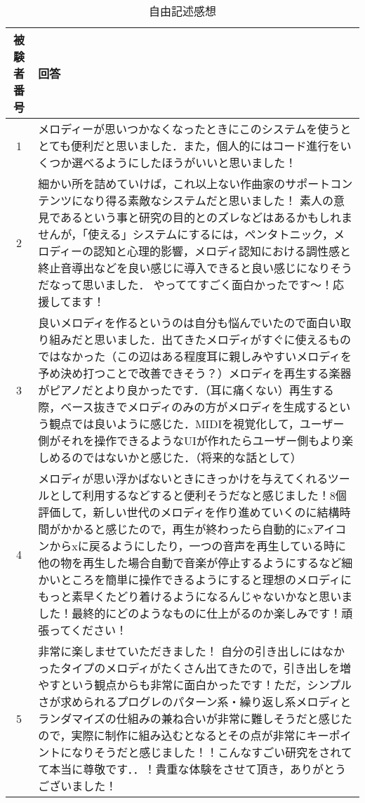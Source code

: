 \begin{table}[htbp]
  \begin{center}
    \caption{自由記述感想}
    \begin{tabular}{cp{30em}}
      \hline
      被験者番号 & 回答\rule[-3mm]{0mm}{8mm} \\ \hline \hline
      1 & メロディーが思いつかなくなったときにこのシステムを使うととても便利だと思いました．また，個人的にはコード進行をいくつか選べるようにしたほうがいいと思いました！ \\ \hline
      2 & 細かい所を詰めていけば，これ以上ない作曲家のサポートコンテンツになり得る素敵なシステムだと思いました！
      素人の意見であるという事と研究の目的とのズレなどはあるかもしれませんが，「使える」システムにするには，ペンタトニック，メロディーの認知と心理的影響，メロディ認知における調性感と終止音導出などを良い感じに導入できると良い感じになりそうだなって思いました．
      やっててすごく面白かったです～！応援してます！ \\ \hline
      3 & 良いメロディを作るというのは自分も悩んでいたので面白い取り組みだと思いました．出てきたメロディがすぐに使えるものではなかった（この辺はある程度耳に親しみやすいメロディを予め決め打つことで改善できそう？）メロディを再生する楽器がピアノだとより良かったです．（耳に痛くない）再生する際，ベース抜きでメロディのみの方がメロディを生成するという観点では良いように感じた．MIDIを視覚化して，ユーザー側がそれを操作できるようなUIが作れたらユーザー側もより楽しめるのではないかと感じた．（将来的な話として） \\ \hline
      4 & メロディが思い浮かばないときにきっかけを与えてくれるツールとして利用するなどすると便利そうだなと感じました！8個評価して，新しい世代のメロディを作り進めていくのに結構時間がかかると感じたので，再生が終わったら自動的にxアイコンからxに戻るようにしたり，一つの音声を再生している時に他の物を再生した場合自動で音楽が停止するようにするなど細かいところを簡単に操作できるようにすると理想のメロディにもっと素早くたどり着けるようになるんじゃないかなと思いました！最終的にどのようなものに仕上がるのか楽しみです！頑張ってください！ \\ \hline
      5 & 非常に楽しませていただきました！
      自分の引き出しにはなかったタイプのメロディがたくさん出てきたので，引き出しを増やすという観点からも非常に面白かったです！ただ，シンプルさが求められるプログレのパターン系・繰り返し系メロディとランダマイズの仕組みの兼ね合いが非常に難しそうだと感じたので，実際に制作に組み込むとなるとその点が非常にキーポイントになりそうだと感じました！！こんなすごい研究をされてて本当に尊敬です．．！貴重な体験をさせて頂き，ありがとうございました！ \\ \hline

\end{tabular}
\end{center}
\end{table}

